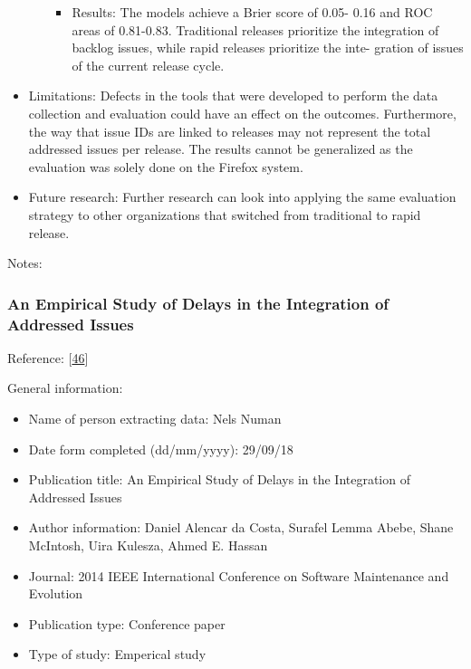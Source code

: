 \documentclass[]{book}
\providecommand{\tightlist}{%
  \setlength{\itemsep}{0pt}\setlength{\parskip}{0pt}}
\begin{document}
\begin{itemize}
\begin{itemize}
    \begin{itemize}
    \tightlist
    \item
      Results: The models achieve a Brier score of 0.05- 0.16 and ROC
      areas of 0.81-0.83. Traditional releases prioritize the
      integration of backlog issues, while rapid releases prioritize the
      inte- gration of issues of the current release cycle.
    \end{itemize}
  \end{itemize}
\item
  Limitations: Defects in the tools that were developed to perform the
  data collection and evaluation could have an effect on the outcomes.
  Furthermore, the way that issue IDs are linked to releases may not
  represent the total addressed issues per release. The results cannot
  be generalized as the evaluation was solely done on the Firefox
  system.
\item
  Future research: Further research can look into applying the same
  evaluation strategy to other organizations that switched from
  traditional to rapid release.
\end{itemize}

Notes:

\subsubsection{An Empirical Study of Delays in the Integration of
Addressed
Issues}\label{an-empirical-study-of-delays-in-the-integration-of-addressed-issues}

Reference: {[}\protect\hyperlink{ref-da2014a}{46}{]}

General information:

\begin{itemize}
\tightlist
\item
  Name of person extracting data: Nels Numan
\item
  Date form completed (dd/mm/yyyy): 29/09/18
\item
  Publication title: An Empirical Study of Delays in the Integration of
  Addressed Issues
\item
  Author information: Daniel Alencar da Costa, Surafel Lemma Abebe,
  Shane McIntosh, Uira Kulesza, Ahmed E. Hassan
\item
  Journal: 2014 IEEE International Conference on Software Maintenance
  and Evolution
\item
  Publication type: Conference paper
\item
  Type of study: Emperical study
\end{itemize}
\end{document}
